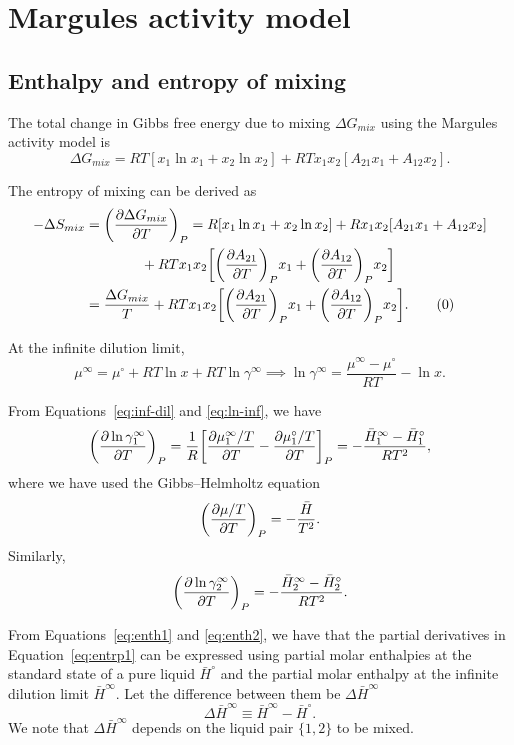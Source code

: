 \section{Margules activity model}

\subsection{Enthalpy and entropy of mixing}

The total change in Gibbs free energy due to mixing $\Delta G_{mix}$ using the
Margules activity model is
\begin{equation}\label{eq:margules}
    \Delta G_{mix} = RT[x_1 \ln x_1 + x_2 \ln x_2] + RTx_1x_2[A_{21}x_1 +
    A_{12}x_2].
\end{equation}

The entropy of mixing can be derived as
\begin{align*}\label{eq:entrp1}
    -\Delta S_{mix} &= \qty(\pdv{\Delta G_{mix}}{T})_P = R[x_1\ln x_1 + x_2\ln
    x_2] + Rx_1x_2[A_{21}x_1 + A_{12}x_2] \\&\qquad\qquad + RTx_1x_2 \qty[ 
    \qty(\pdv{A_{21}}{T})_Px_1 + \qty(\pdv{A_{12}}{T})_Px_2] \\
    &= \dfrac{\Delta G_{mix}}{T} + RTx_1x_2 \qty[ 
    \qty(\pdv{A_{21}}{T})_Px_1 + \qty(\pdv{A_{12}}{T})_Px_2]. 
    \tag{\theequation}
\end{align*}

At the infinite dilution limit,
\begin{equation}\label{eq:ln-inf}
    \mu^\infty = \mu^\circ + RT\ln x + RT\ln \gamma^\infty \implies
    \ln \gamma^\infty = \dfrac{\mu^\infty - \mu^\circ}{RT} - \ln x.
\end{equation}

From Equations~\ref{eq:inf-dil} and \ref{eq:ln-inf}, we have
\begin{equation}\label{eq:enth1}
    \qty(\pdv{\ln \gamma_1^\infty}{T})_P = \frac1R\qty[\pdv{\mu_1^\infty/T}{T} -
    \pdv{\mu_1^\circ/T}{T}]_P = -\dfrac{\bar H_1^\infty - \bar H_1^\circ}
    {RT^2},
\end{equation}
where we have used the Gibbs--Helmholtz equation
\[
    \qty(\pdv{\mu/T}{T})_P = -\dfrac{\bar H}{T^2}.
\]
Similarly,
\begin{equation}\label{eq:enth2}
    \qty(\pdv{\ln \gamma_2^\infty}{T})_P = -\dfrac{\bar H_2^\infty - \bar H_2^\circ}
    {RT^2}.
\end{equation}

From Equations~\ref{eq:enth1} and \ref{eq:enth2}, we have that the partial
derivatives in Equation~\ref{eq:entrp1} can be expressed using partial molar
enthalpies at the standard state of a pure liquid $\bar H^\circ$ and the
partial molar enthalpy at the infinite dilution limit $\bar H^\infty$. Let the
difference between them be $\Delta \bar H^\infty$
\[
    \Delta \bar H^\infty \equiv \bar H^\infty - \bar H^\circ.
\]
We note that $\Delta \bar H^\infty$ depends on the liquid pair $\{1,2\}$ to
be mixed.

